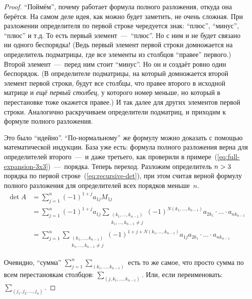 \documentclass[a4paper,12pt]{article}
\theoremstyle{remark}
\begin{document}
  \begin{proof}
    ``Поймём'', почему работает формула полного разложения, откуда она берётся.
    На самом деле идея, как можно будет заметить, не очень сложная.
    При разложении определителя по первой строке чередуется знак: ``плюс'', ``минус'', ``плюс'' и т.д.
    То есть первый элемент~---~``плюс''.
    Но с ним и не будет связано ни одного беспорядка!
    (Ведь первый элемент первой строки домножается на определитель подматрицы, где все элементы из столбцов ``правее'' первого.)
    Второй элемент~---~перед ним стоит ``минус''.
    Но он и создаёт ровно один беспорядок.
    (В определителе подматрицы, на который домножается второй элемент первой строки, будут все столбцы, что правее второго в исходной матрице и \emph{ещё первый столбец}, у которого номер меньше, но который в перестановке тоже окажется правее.)
    И так далее для других элементов первой строки.
    Аналогично раскручиваем определители подматриц, и приходим к формуле полного разложения.
    
    Это было ``идейно''.
    ``По-нормальному'' же формулу можно доказать с помощью математической индукции.
    База уже есть: формула полного разложения верна для определителей второго~---~и даже третьего, как проверили в примере~(\ref{eq:full-expansion-3x3})~---~порядка.
    Теперь переход.
    Разложим определитель $n \hm> 3$ порядка по первой строке~(\ref{eq:recursive-det}), при этом считая верной формулу полного разложения для определителей всех порядков меньше~$n$.
    \begin{equation}
    \begin{split}
      \det A &= \sum\limits_{j=1}^n (-1)^{1+j} a_{1j} M_{1j}\\
      &= \sum\limits_{j=1}^n (-1)^{1+j} a_{1j} \sum\limits_{\substack{(k_1, \ldots, k_{n-1}) \\ k_1, \ldots, k_{n-1} \not= j}} (-1)^{N(k_1, \ldots, k_{n-1})} a_{2 k_1} \cdot \ldots \cdot a_{n k_{n-1}}\\
      &= \sum\limits_{j=1}^n \sum\limits_{\substack{(k_1, \ldots, k_{n-1}) \\ k_1, \ldots, k_{n-1} \not= j}} (-1)^{1+j+N(k_1, \ldots, k_{n-1})} a_{1j} a_{2 k_1} \cdot \ldots \cdot a_{n k_{n-1}}
    \end{split}
    \end{equation}
    
    Очевидно, ``сумма'' $\sum_{j=1}^n \sum_{(k_1, \ldots, k_{n-1})}$ есть то же самое, что просто сумма по всем перестановкам столбцов: $\sum_{(j, k_1, \ldots, k_{n-1})}$.
    Или, если переименовать: $\sum_{(j_1, j_2, \ldots, j_n)}$.
    

\end{proof}
\end{document}

